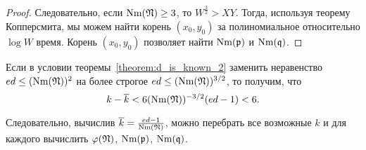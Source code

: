 \documentclass[_00_dissertation.tex]{subfiles}
\begin{document}
\begin{proof}
    Следовательно, если $\textrm{Nm}(\mathfrak{N}) \ge 3$, то $W^{\frac{3}{2}} > XY$.
    Тогда, используя теорему Копперсмита, мы можем найти корень $(x_0, y_0)$ за полиномиальное относительно $\log W$ время.
    Корень $(x_0, y_0)$ позволяет найти $\textrm{Nm}(\mathfrak{p})$ и $\textrm{Nm}(\mathfrak{q})$.
\end{proof}

\begin{remark}
    Если в условии теоремы~\ref{theorem:d_is_known_2} заменить неравенство $ed \le (\textrm{Nm}(\mathfrak{N}))^2$ на более строгое $ed \le (\textrm{Nm}(\mathfrak{N}))^{3/2}$, то получим, что
    \begin{equation*}
        k - \overline{k} < 6(\textrm{Nm}(\mathfrak{N}))^{-3/2}(ed-1) < 6.
    \end{equation*}
    
    Следовательно, вычислив $\overline{k} = \frac{ed-1}{\textrm{Nm}(\mathfrak{N})}$, можно перебрать все возможные $k$ и для каждого вычислить $\varphi(\mathfrak{N})$, $\textrm{Nm}(\mathfrak{p})$, $\textrm{Nm}(\mathfrak{q})$.
\end{remark}
\end{document}
